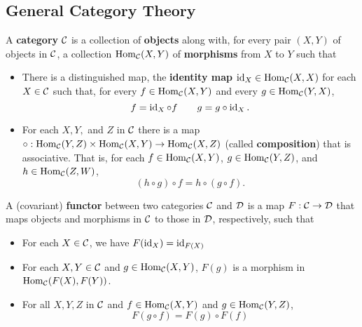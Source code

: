 \documentclass[12pt]{article}
\begin{document}
\subsection{General Category Theory}
\begin{defn}
  A \textbf{category} $\mathcal{C}$ is a collection of \textbf{objects} along with, for every pair $(X,Y)$ of objects in $\mathcal{C}$, a collection $\operatorname{Hom}_{\mathcal{C}}(X,Y)$ of \textbf{morphisms} from $X$ to $Y$ such that
  \begin{itemize}
    \item There is a distinguished map, the \textbf{identity map} $\operatorname{id}_X\in\operatorname{Hom}_{\mathcal{C}}(X,X)$ for each $X\in\mathcal{C}$ such that, for every $f\in\operatorname{Hom}_{\mathcal{C}}(X,Y)$ and every $g\in\operatorname{Hom}_{\mathcal{C}}(Y,X)$,
    \[f=\operatorname{id}_X\circ f\qquad g=g\circ\operatorname{id}_X.\]
    \item For each $X,Y,$ and $Z$ in $\mathcal{C}$ there is a map $\circ:\operatorname{Hom}_{\mathcal{C}}(Y,Z)\times\operatorname{Hom}_{\mathcal{C}}(X,Y)\to\operatorname{Hom}_{\mathcal{C}}(X,Z)$ (called \textbf{composition}) that is associative. That is, for each $f\in\operatorname{Hom}_{\mathcal{C}}(X,Y)$, $g\in\operatorname{Hom}_{\mathcal{C}}(Y,Z)$, and $h\in\operatorname{Hom}_{\mathcal{C}}(Z,W)$,
    \[(h\circ g)\circ f=h\circ(g\circ f).\]
  \end{itemize}
\end{defn}
\begin{defn}
  A (covariant) \textbf{functor} between two categories $\mathcal{C}$ and $\mathcal{D}$ is a map $F:\mathcal{C}\to\mathcal{D}$ that maps objects and morphisms in $\mathcal{C}$ to those in $\mathcal{D}$, respectively, such that 
  \begin{itemize}
    \item For each $X\in\mathcal{C}$, we have $F(\operatorname{id}_X)=\operatorname{id}_{F(X)}$
    \item For each $X,Y\in\mathcal{C}$ and $g\in\operatorname{Hom}_{\mathcal{C}}(X,Y)$, $F(g)$ is a morphism in $\operatorname{Hom}_{\mathcal{C}}(F(X),F(Y))$.
    \item For all $X,Y,Z$ in $\mathcal{C}$ and $f\in\operatorname{Hom}_{\mathcal{C}}(X,Y)$ and $g\in\operatorname{Hom}_{\mathcal{C}}(Y,Z)$,
    \[F(g\circ f)=F(g)\circ F(f)\]
  \end{itemize}

\end{defn}
\end{document}
